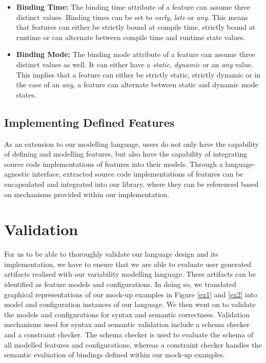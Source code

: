 \documentclass[conference]{IEEEtran}
\begin{document}
\begin{itemize}
\begin{itemize}
    \item \textbf{Binding Time:} The binding time attribute of a feature can assume three distinct values. Binding times can be set to \textit{early}, \textit{late} or \textit{any}. This means that features can either be strictly bound at compile time, strictly bound at runtime or can alternate between compile time and runtime state values.
    
    \item \textbf{Binding Mode:} The binding mode attribute of a feature can assume three distinct values as well. It can either have a \textit{static}, \textit{dynamic} or an \textit{any} value. This implies that a feature can either be strictly static, strictly dynamic or in the case of an \textit{any}, a feature can alternate between static and dynamic mode states.
\end{itemize}

\end{itemize}

\subsection{Implementing Defined Features}
As an extension to our modelling language, users do not only have the capability of defining and modelling features, but also have the capability of integrating source code implementations of features into their models. Through a language-agnostic interface, extracted source code implementations of features can be encapsulated and integrated into our library, where they can be referenced based on mechanisms provided within our implementation.

\section{Validation}
For us to be able to thoroughly validate our language design and its implementation, we have to ensure that we are able to evaluate user generated artifacts realised with our variability modelling language. These artifacts can be identified as feature models and configurations. In doing so, we translated graphical representations of our mock-up examples in Figure \ref{ex1} and \ref{ex2} into model and configuration instances of our language. We then went on to validate the models and configurations for syntax and semantic correctness. Validation mechanisms used for syntax and semantic validation include a schema checker and a constraint checker. The schema checker is used to evaluate the schema of all modelled features and configurations, whereas a constraint checker handles the semantic evaluation of bindings defined within our mock-up examples.
\end{document}
